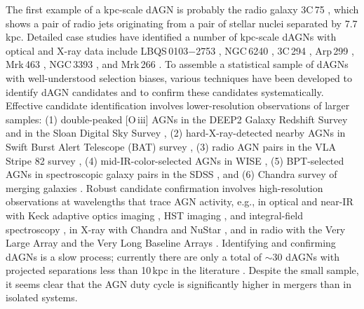 \documentclass[iop,revtex4,twocolumn,apj,numberedappendix,appendixfloats]{emulateapj}
\begin{document}
The first example of a kpc-scale dAGN is probably the radio galaxy 3C\,75 \citep{Owen85}, which shows a pair of radio jets originating from a pair of stellar nuclei separated by 7.7\,kpc. Detailed case studies have identified a number of kpc-scale dAGNs with optical and X-ray data include LBQS\,0103$-$2753 \citep{Junkkarinen01}, NGC\,6240 \citep{Komossa03}, 3C\,294 \citep{Stockton04}, Arp\,299 \citep{Ballo04}, Mrk\,463 \citep{Bianchi08}, NGC\,3393 \citep{Fabbiano11}, and Mrk\,266 \citep{Mazzarella12}.
%
To assemble a statistical sample of dAGNs with well-understood selection biases, various techniques have been developed to identify dAGN candidates and to confirm these candidates systematically. 
%
Effective candidate identification involves lower-resolution observations of larger samples: (1) double-peaked [O\,{\sc iii}] AGNs in the DEEP2 Galaxy Redshift Survey \citep{Gerke07,Comerford09a} and in the Sloan Digital Sky Survey \citep[SDSS;][]{Wang09,Liu10a,Smith10}, (2) hard-X-ray-detected nearby AGNs in Swift Burst Alert Telescope (BAT) survey \citep{Koss10}, (3) radio AGN pairs in the VLA Stripe 82 survey \citep{Fu15a}, (4) mid-IR-color-selected AGNs in WISE \citep{Satyapal14,Satyapal17}, (5) BPT-selected AGNs in spectroscopic galaxy pairs in the SDSS \citep{Ellison11,Liu12,Fu18}, and (6) Chandra survey of merging galaxies \citep{Brassington07,Teng12}.
%
Robust candidate confirmation involves high-resolution observations at wavelengths that trace AGN activity, e.g., in optical and near-IR with Keck adaptive optics imaging \citep{Fu11a,Rosario11}, HST imaging \citep{Liu13,Comerford15,Liu17c}, and integral-field spectroscopy \citep{McGurk11,Fu12a}, in X-ray with Chandra \citep{Comerford11,Koss11,Koss12,Teng12,Liu13a,Comerford15,Ellison17} and NuStar \citep{Ptak15,Koss16}, and in radio with the Very Large Array \citep{Fu11b,Fu15b,Muller-Sanchez15} and the Very Long Baseline Arrays \citep{Tingay11,Deane14,Wrobel14,Bondi16,Liu17b}.
%
Identifying and confirming dAGNs is a slow process; currently there are only a total of $\sim$30 dAGNs with projected separations less than 10\,kpc in the literature \citep[see][for a compilation]{Satyapal17}. Despite the small sample, it seems clear that the AGN duty cycle is significantly higher in mergers than in isolated systems. 
\end{document}
